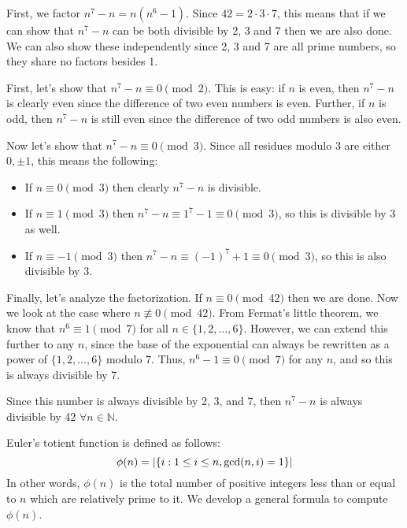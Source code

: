\documentclass[11pt]{article}
\begin{document}
\begin{solution}
  First, we factor $n^7 - n = n(n^6 - 1)$. Since $42 = 2 \cdot 3 \cdot 7$, this means that if we can show that $n^7 - n$ can be both divisible by 2, 3 and 7 then we are also done. We can also show these independently since 2, 3 and 7 are all prime numbers, so they share no factors besides 1. 

  First, let's show that $n^7 - n \equiv 0 \pmod{2}$. This is easy: if $n$ is even, then $n^7 - n$ is clearly even since the difference of two even numbers is even. Further, if $n$ is odd, then $n^7 - n$ is still even since the difference of two odd numbers is also even.

  Now let's show that $n^7 - n \equiv 0 \pmod{3}$. Since all residues modulo 3 are either $0, \pm 1$, this means the following: 

  \begin{itemize}
    \item If $n \equiv 0 \pmod{3}$ then clearly $n^7 - n$ is divisible. 
    \item If $n \equiv 1 \pmod{3}$ then $n^7 - n \equiv 1^7 - 1 \equiv 0 \pmod{3}$, so this is divisible by 3 as well.
    \item If $n \equiv -1 \pmod{3}$ then $n^7 - n \equiv (-1)^7 + 1 \equiv 0 \pmod{3}$, so this is also divisible by 3.
  \end{itemize}

  Finally, let's analyze the factorization. If $n \equiv 0 \pmod {42}$ then we are done. Now we look at the case where $n \not\equiv 0 \pmod{42}$. From Fermat's little theorem, we know that $n^6 \equiv 1 \pmod {7}$ for all $n \in \{1, 2, \dots, 6\}$. However, we can extend this further to any $n$, since the base of the exponential can always be rewritten as a power of $\{1, 2, \dots, 6\}$ modulo 7. Thus, $n^6 -1 \equiv 0 \pmod{7}$ for any $n$, and so this is always divisible by 7.  

  Since this number is always divisible by 2, 3, and 7, then $n^7 - n$ is always divisible by 42 $\forall n \in \mathbb N$.
\end{solution}
\pagebreak
{} 

  Euler's totient function is defined as follows:
  \[ \phi(n) = \left\lvert \{i: 1 \leq i \leq n, \gcd(n,i) = 1\} \right\rvert\]
  In other words, $\phi(n)$ is the total number of positive integers less than or equal to $n$ which are relatively prime to it. We develop a general formula to compute $\phi(n)$.
\end{document}
